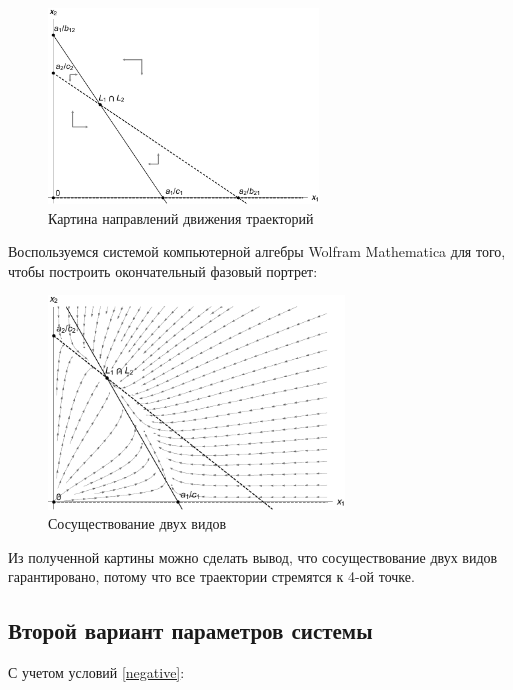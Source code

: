 \documentclass[12pt,a4paper]{article}
\begin{document}
    \begin{figure}[h]
        \centering
        \includegraphics[width=0.64\textwidth]{areas_1*.pdf}
        \caption{Картина направлений движения траекторий}
        \label{fig:areas_1*}
    \end{figure}

    \pagebreak

    Воспользуемся системой компьютерной алгебры Wolfram Mathematica для того, чтобы построить окончательный фазовый портрет:
    \begin{figure}[h]
        \centering
        \includegraphics[width=0.7\textwidth]{phase_1.pdf}
        \caption{Сосуществование двух видов}
        \label{fig:phase_1}
    \end{figure}

    Из полученной картины можно сделать вывод, что сосуществование двух видов  гарантировано, потому что все траектории стремятся к 4-ой точке.

    \subsection{Второй вариант параметров системы}

    С учетом условий \eqref{negative}: 
\end{document}
